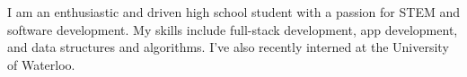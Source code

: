 

\begin{cvparagraph}
    I am an enthusiastic and driven high school student with a passion for STEM and software development. My skills include full-stack development, app development, and data structures and algorithms. I've also recently interned at the University of Waterloo.
\end{cvparagraph}
